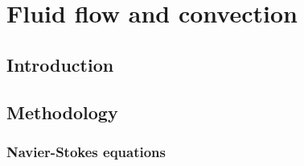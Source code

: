 \chapter{Fluid flow and convection}\label{ch:fluid}

\section{Introduction}


\section{Methodology}

\subsection{Navier-Stokes equations}


